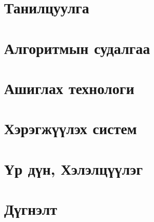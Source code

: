 
\chapter{Танилцуулга}


\chapter{Алгоритмын судалгаа}


\chapter{Ашиглах технологи}


\chapter{Хэрэгжүүлэх систем}


\chapter{Үр дүн, Хэлэлцүүлэг}


\chapter{Дүгнэлт}

